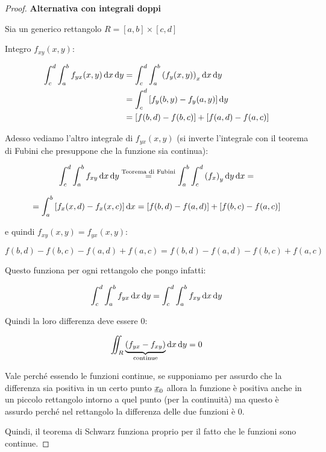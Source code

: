 \pagebreak
\begin{proof} \textbf{Alternativa con integrali doppi}

    Sia un generico rettangolo \(R = [a,b]\times [c,d]\)

    Integro \(f_{xy}(x,y)\):

    \begin{spreadlines}{2mm}
        \begin{align*}
            \int_c^d \int_a^b {f_{yx}(x,y)} \mathop{}\!\mathrm{d}{x}\mathop{}\!\mathrm{d}{y} & = \int_c^d \int_a^b {(f_y(x,y))}_x \mathop{}\!\mathrm{d}{x}\mathop{}\!\mathrm{d}{y}               \\
                                                             & = \int_c^d \left[ f_y(b,y) - f_y(a,y) \right] \mathop{}\!\mathrm{d}{y}            \\
                                                             & = \left[ f(b,d) - f(b,c) \right] + \left[ f(a,d) - f(a,c) \right]
        \end{align*}
    \end{spreadlines}

    Adesso vediamo l'altro integrale di \(f_{yx}(x,y)\) (si inverte l'integrale con il teorema di Fubini che presuppone che la funzione sia continua):

    \[
        \int_c^d \int_a^b f_{xy} \mathop{}\!\mathrm{d}{x}\mathop{}\!\mathrm{d}{y} \overset{\text{Teorema di Fubini}}{=} \int_a^b \int_c^d {(f_x)}_y \mathop{}\!\mathrm{d}{y}\mathop{}\!\mathrm{d}{x} =
    \]

    \[
        =\int_a^b \left[ f_x(x,d) - f_x(x,c) \right] \mathop{}\!\mathrm{d}{x}  = [f(b,d) - f(a,d)] + [f(b,c) - f(a,c)]
    \]

    e quindi \(f_{xy}(x,y) = f_{yx}(x,y)\):

    \[
        f(b,d) - f(b,c) - f(a,d) + f(a,c) = f(b,d) - f(a,d) - f(b,c) + f(a,c)
    \]

    Questo funziona per ogni rettangolo che pongo infatti:

    \[
        \int_c^d \int_a^b f_{yx} \mathop{}\!\mathrm{d}{x}\mathop{}\!\mathrm{d}{y} =  \int_c^d \int_a^b f_{xy} \mathop{}\!\mathrm{d}{x}\mathop{}\!\mathrm{d}{y}
    \]

    Quindi la loro differenza deve essere 0:

    \[
        \iint_R \underbrace{{(f_{yx} - f_{xy})}}_\text{continue} \mathop{}\!\mathrm{d}{x}\mathop{}\!\mathrm{d}{y} = 0
    \]

    Vale perché essendo le funzioni continue, se supponiamo per assurdo che la differenza sia positiva in un certo punto \(\underline{x}_0\) allora la funzione è positiva anche in un piccolo rettangolo intorno a quel punto (per la continuità) ma questo è assurdo perché nel rettangolo la differenza delle due funzioni è 0.

    Quindi, il teorema di Schwarz funziona proprio per il fatto che le funzioni sono continue.

\end{proof}

